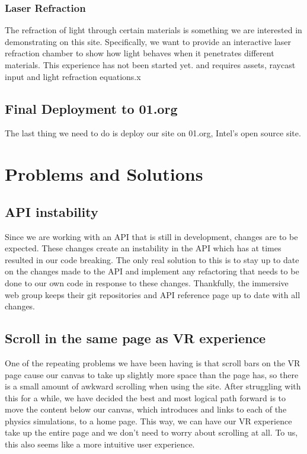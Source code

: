 \documentclass[onecolumn, draftclsnofoot,10pt, compsoc]{IEEEtran}
\begin{document}
\subsubsection{Laser Refraction}
The refraction of light through certain materials is something we are interested in demonstrating on this site. Specifically, we want to provide an interactive laser refraction chamber to show how light behaves when it penetrates different materials. This experience has not been started yet. and requires assets, raycast input and light refraction equations.x
\subsection{Final Deployment to 01.org}
The last thing we need to do is deploy our site on 01.org, Intel's open source site. 

\section{Problems and Solutions}

\subsection{API instability}
Since we are working with an API that is still in development, changes are to be expected. These changes create an instability in the API which has at times resulted in our code breaking. The only real solution to this is to stay up to date on the changes made to the API and implement any refactoring that needs to be done to our own code in response to these changes. Thankfully, the immersive web group keeps their git repositories and API reference page up to date with all changes. 

\subsection{Scroll in the same page as VR experience}
One of the repeating problems we have been having is that scroll bars on the VR page cause our canvas to take up slightly more space than the page has, so there is a small amount of awkward scrolling when using the site. After struggling with this for a while, we have decided the best and most logical path forward is to move the content below our canvas, which introduces and links to each of the physics simulations, to a home page. This way, we can have our VR experience take up the entire page and we don't need to worry about scrolling at all. To us, this also seems like a more intuitive user experience.
\end{document}
